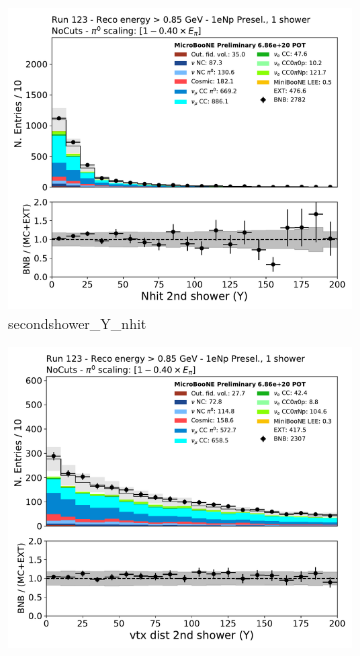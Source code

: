 \begin{figure}[H]
    \centering
    \begin{subfigure}{0.3\textwidth}
    \includegraphics[width=1.0\textwidth]{Sidebands/Figures/1eNp/HighEnergy/HiEext_NPOneShr_None_pi0e040/secondshower_Y_nhit.pdf}
    \caption{secondshower\_Y\_nhit}
    \end{subfigure}
    \begin{subfigure}{0.3\textwidth}
    \includegraphics[width=1.0\textwidth]{Sidebands/Figures/1eNp/HighEnergy/HiEext_NPOneShr_None_pi0e040/secondshower_Y_vtxdist.pdf}

\end{subfigure}
\end{figure}
